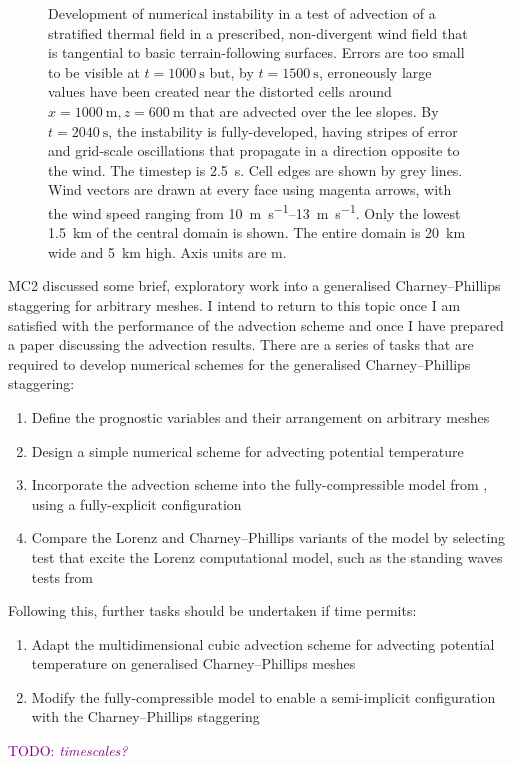 \documentclass[a4paper,11pt]{article}
\newcommand{\TODO}[1]{\textcolor{purple}{TODO: \emph{#1}}}
\begin{document}
\begin{figure}
%
\caption{Development of numerical instability in a test of advection of a stratified thermal field in a prescribed, non-divergent wind field that is tangential to basic terrain-following surfaces.  Errors are too small to be visible at $t = \SI{1000}{\second}$ but, by $t = \SI{1500}{\second}$, erroneously large values have been created near the distorted cells around $x = \SI{1000}{\meter}, z = \SI{600}{\meter}$ that are advected over the lee slopes.  By $t = \SI{2040}{\second}$, the instability is fully-developed, having stripes of error and grid-scale oscillations that propagate in a direction opposite to the wind.  The timestep is \SI{2.5}{\second}.
Cell edges are shown by grey lines.  Wind vectors are drawn at every face using magenta arrows, with the wind speed ranging from \SIrange{10}{13}{\meter\per\second}.  Only the lowest \SI{1.5}{\kilo\meter} of the central domain is shown.  The entire domain is \SI{20}{\kilo\meter} wide and \SI{5}{\kilo\meter} high.  Axis units are \si{\meter}.}
\label{fig:instability}
\end{figure}

MC2 discussed some brief, exploratory work into a generalised Charney--Phillips staggering for arbitrary meshes.  I intend to return to this topic once I am satisfied with the performance of the advection scheme and once I have prepared a paper discussing the advection results.
There are a series of tasks that are required to develop numerical schemes for the generalised Charney--Phillips staggering:
\begin{enumerate}
\item Define the prognostic variables and their arrangement on arbitrary meshes
\item Design a simple numerical scheme for advecting potential temperature
\item Incorporate the advection scheme into the fully-compressible model from \citet{weller-shahrokhi2014}, using a fully-explicit configuration
\item Compare the Lorenz and Charney--Phillips variants of the model by selecting test that excite the Lorenz computational model, such as the standing waves tests from \citet{arakawa-konor1996}
\end{enumerate}
Following this, further tasks should be undertaken if time permits:
\begin{enumerate}[resume]
\item Adapt the multidimensional cubic advection scheme for advecting potential temperature on generalised Charney--Phillips meshes
\item Modify the fully-compressible model to enable a semi-implicit configuration with the Charney--Phillips staggering
\end{enumerate}
\TODO{timescales?}
\end{document}
